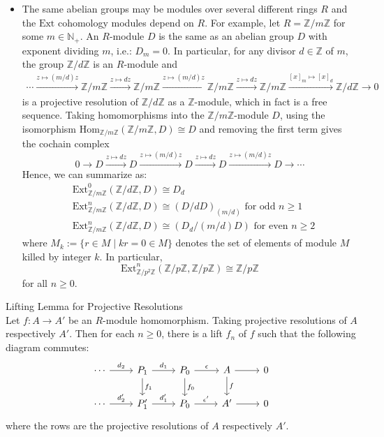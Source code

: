 \begin{itemize}
    \item The same abelian groups may be modules over several different rings $R$ and the $\text{Ext}$ cohomology modules depend on $R$. For example, let $R= \mathbb{Z}/ m\mathbb{Z}$ for some $m\in \mathbb{N}_+$. An $R$-module $D$ is the same as an abelian group $D$ with exponent dividing $m$, i.e.: $D_m=0$. In particular, for any divisor $d \in \mathbb{Z}$ of $m$, the group $\mathbb{Z}/d \mathbb{Z}$ is an $R$-module and 
    \begin{align*}
        \cdots \xrightarrow{z \mapsto (m/d)z} \mathbb{Z}/ m\mathbb{Z} \xrightarrow{z \mapsto dz} \mathbb{Z} /m\mathbb{Z} \xrightarrow{z\mapsto (m/d)z} \mathbb{Z}/ m\mathbb{Z} \xrightarrow{z \mapsto dz} \mathbb{Z}/ m\mathbb{Z} \xrightarrow{[x]_m \mapsto [x]_d} \mathbb{Z}/ d\mathbb{Z} \to 0
    \end{align*}
    is a projective resolution of $\mathbb{Z}/ d\mathbb{Z}$ as a $\mathbb{Z}$-module, which in fact is a free sequence. Taking homomorphisms into the $\mathbb{Z}/ m\mathbb{Z}$-module $D$, using the isomorphism $\text{Hom}_{\mathbb{Z}/ m\mathbb{Z}} (\mathbb{Z} /m\mathbb{Z} ,D) \cong D$ and removing the first term gives the cochain complex
    \[
    0 \to D \xrightarrow{z \mapsto dz} D \xrightarrow{z \mapsto (m/d)z} D \xrightarrow{z \mapsto dz} D \xrightarrow{z \mapsto (m/d)z} D \to \cdots
    \]
    Hence, we can summarize as:
    \begin{align*}
        &\text{Ext}^0_{\mathbb{Z}/ m\mathbb{Z}} (\mathbb{Z}/ d\mathbb{Z} ,D) \cong D_d\\
        &\text{Ext}^n_{\mathbb{Z}/ m\mathbb{Z}} (\mathbb{Z}/ d\mathbb{Z} ,D) \cong (D/ dD) _{(m/d)} \text{ for odd } n\geq 1\\
        &\text{Ext}^n_{\mathbb{Z}/ m\mathbb{Z}} (\mathbb{Z}/ d\mathbb{Z} ,D) \cong (D_d/ (m/d)D) \text{ for even } n\geq 2
    \end{align*}
    where $M_k := \{ r\in M \mid kr=0\in M\}$ denotes the set of elements of module $M$ killed by integer $k$. In particular,
    \[
    \text{Ext}_{\mathbb{Z} /p^2\mathbb{Z}}^n (\mathbb{Z}/ p\mathbb{Z}, \mathbb{Z}/p\mathbb{Z}) \cong \mathbb{Z} /p\mathbb{Z}
    \]
    for all $n\geq 0$.
\end{itemize}

\begin{lemma}{Lifting Lemma for Projective Resolutions}\\
Let $f:A\to A'$ be an $R$-module homomorphism. Taking projective resolutions of $A$ respectively $A'$. Then for each $n\geq 0$, there is a lift $f_n$ of $f$ such that the following diagram commutes:
\[
\begin{tikzcd}
    \cdots \arrow[r, "d_2"] &P_1 \arrow[r, "d_1"] \arrow[d, "f_1"] &P_0 \arrow[r, "\epsilon"] \arrow[d, "f_0"] &A \arrow[r] \arrow[d, "f"] &0\\
    \cdots \arrow[r, "d_2'"] &P_1' \arrow[r, "d_1'"] &P_0 \arrow[r, "\epsilon'"] &A' \arrow[r] &0
\end{tikzcd}
\]
where the rows are the projective resolutions of $A$ respectively $A'$.
\end{lemma}

